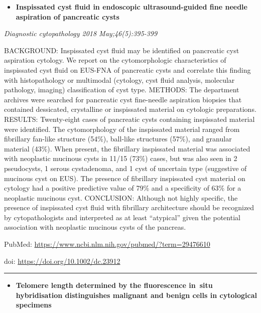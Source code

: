 \documentclass[]{article}
\providecommand{\tightlist}{%
  \setlength{\itemsep}{0pt}\setlength{\parskip}{0pt}}
\begin{document}
\begin{itemize}
\tightlist
\item
  \textbf{Inspissated cyst fluid in endoscopic ultrasound-guided fine
  needle aspiration of pancreatic cysts}
\end{itemize}

\emph{Diagnostic cytopathology 2018 May;46(5):395-399}

BACKGROUND: Inspissated cyst fluid may be identified on pancreatic cyst
aspiration cytology. We report on the cytomorphologic characteristics of
inspissated cyst fluid on EUS-FNA of pancreatic cysts and correlate this
finding with histopathology or multimodal (cytology, cyst fluid
analysis, molecular pathology, imaging) classification of cyst type.
METHODS: The department archives were searched for pancreatic cyst
fine-needle aspiration biopsies that contained dessicated, crystalline
or inspissated material on cytologic preparations. RESULTS: Twenty-eight
cases of pancreatic cysts containing inspissated material were
identified. The cytomorphology of the inspissated material ranged from
fibrillary fan-like structure (54\%), ball-like structures (57\%), and
granular material (43\%). When present, the fibrillary inspissated
material was associated with neoplastic mucinous cysts in 11/15 (73\%)
cases, but was also seen in 2 pseudocysts, 1 serous cystadenoma, and 1
cyst of uncertain type (suggestive of mucinous cyst on EUS). The
presence of fibrillary inspissated cyst material on cytology had a
positive predictive value of 79\% and a specificity of 63\% for a
neoplastic mucinous cyst. CONCLUSION: Although not highly specific, the
presence of inspissated cyst fluid with fibrillary architecture should
be recognized by cytopathologists and interpreted as at least
``atypical'' given the potential association with neoplastic mucinous
cysts of the pancreas.

PubMed: \url{https://www.ncbi.nlm.nih.gov/pubmed/?term=29476610}

doi: \url{https://doi.org/10.1002/dc.23912}

{}

{}

\begin{center}\rule{0.5\linewidth}{\linethickness}\end{center}

\begin{itemize}
\tightlist
\item
  \textbf{Telomere length determined by the fluorescence in~situ
  hybridisation distinguishes malignant and benign cells in cytological
  specimens}
\end{itemize}
\end{document}

